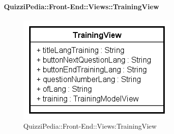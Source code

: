 \paragraph{QuizziPedia::Front-End::Views::TrainingView}
\begin{figure} [ht]
	\centering
	\includegraphics[scale=0.80]{UML/Classi/Front-End/QuizziPedia_Front-end_Views_TrainingView.png}
	\caption{QuizziPedia::Front-End::Views:TrainingView}
\end{figure} \FloatBarrier

